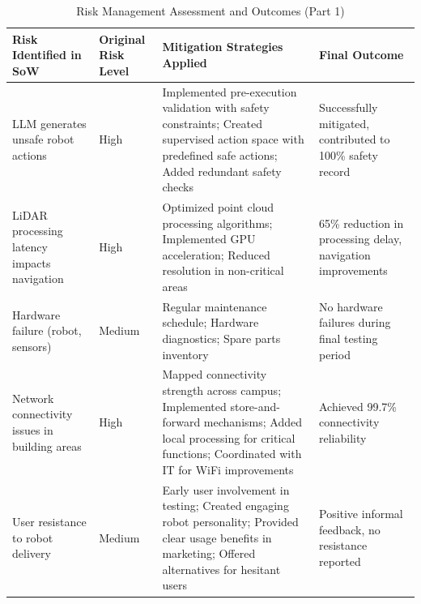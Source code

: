 \documentclass[12pt]{article}
\begin{document}
\renewcommand{\arraystretch}{1.2}
\begin{table}[H]
\centering
\begin{tabularx}{\textwidth}{|X|X|X|X|}
\hline
\textbf{Risk Identified in SoW} & \textbf{Original Risk Level} & \textbf{Mitigation Strategies Applied} & \textbf{Final Outcome} \\
\hline
LLM generates unsafe robot actions & High & Implemented pre-execution validation with safety constraints; Created supervised action space with predefined safe actions; Added redundant safety checks & Successfully mitigated, contributed to 100\% safety record \\
\hline
LiDAR processing latency impacts navigation & High & Optimized point cloud processing algorithms; Implemented GPU acceleration; Reduced resolution in non-critical areas & 65\% reduction in processing delay, navigation improvements \\
\hline
Hardware failure (robot, sensors) & Medium & Regular maintenance schedule; Hardware diagnostics; Spare parts inventory & No hardware failures during final testing period \\
\hline
Network connectivity issues in building areas & High & Mapped connectivity strength across campus; Implemented store-and-forward mechanisms; Added local processing for critical functions; Coordinated with IT for WiFi improvements & Achieved 99.7\% connectivity reliability \\
\hline
User resistance to robot delivery & Medium & Early user involvement in testing; Created engaging robot personality; Provided clear usage benefits in marketing; Offered alternatives for hesitant users & Positive informal feedback, no resistance reported \\
\hline
\end{tabularx}
\caption{Risk Management Assessment and Outcomes (Part 1)}
\label{tab:risk_management1}
\end{table}
\end{document}
